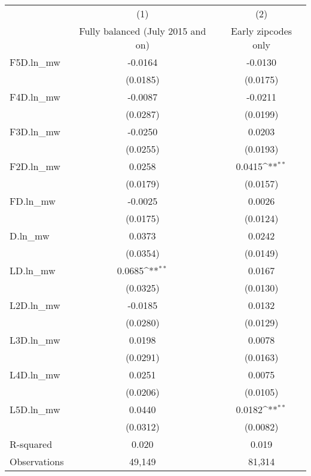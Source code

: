 {
\def\sym#1{\ifmmode^{#1}\else\(^{#1}\)\fi}
\begin{tabular}{l*{2}{c}}
\hline\hline
          &\multicolumn{1}{c}{(1)}&\multicolumn{1}{c}{(2)}\\
          &\multicolumn{1}{c}{Fully balanced (July 2015 and on)}&\multicolumn{1}{c}{Early zipcodes only}\\
\hline
F5D.ln\_mw &  -0.0164         &  -0.0130         \\
          & (0.0185)         & (0.0175)         \\
[1em]
F4D.ln\_mw &  -0.0087         &  -0.0211         \\
          & (0.0287)         & (0.0199)         \\
[1em]
F3D.ln\_mw &  -0.0250         &   0.0203         \\
          & (0.0255)         & (0.0193)         \\
[1em]
F2D.ln\_mw &   0.0258         &   0.0415\sym{**} \\
          & (0.0179)         & (0.0157)         \\
[1em]
FD.ln\_mw  &  -0.0025         &   0.0026         \\
          & (0.0175)         & (0.0124)         \\
[1em]
D.ln\_mw   &   0.0373         &   0.0242         \\
          & (0.0354)         & (0.0149)         \\
[1em]
LD.ln\_mw  &   0.0685\sym{**} &   0.0167         \\
          & (0.0325)         & (0.0130)         \\
[1em]
L2D.ln\_mw &  -0.0185         &   0.0132         \\
          & (0.0280)         & (0.0129)         \\
[1em]
L3D.ln\_mw &   0.0198         &   0.0078         \\
          & (0.0291)         & (0.0163)         \\
[1em]
L4D.ln\_mw &   0.0251         &   0.0075         \\
          & (0.0206)         & (0.0105)         \\
[1em]
L5D.ln\_mw &   0.0440         &   0.0182\sym{**} \\
          & (0.0312)         & (0.0082)         \\
\hline
R-squared &    0.020         &    0.019         \\
Observations&   49,149         &   81,314         \\
\hline\hline
\end{tabular}
}

